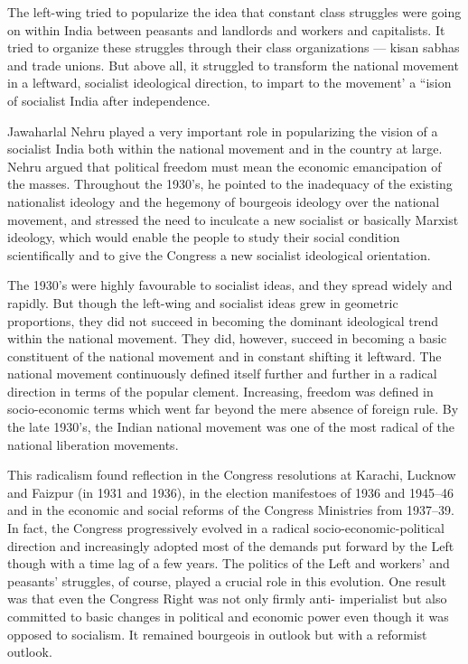 \begin{multicols}{2}
The left-wing tried to popularize the idea that constant class struggles were going on within India between peasants and landlords and workers and capitalists. It tried to organize these struggles through their class organizations --- kisan sabhas and trade unions. But above all, it struggled to transform the national movement in a leftward, socialist ideological direction, to impart to the movement' a ``ision of socialist India after independence.

Jawaharlal Nehru played a very important role in popularizing the vision of a socialist India both within the national movement and in the country at large. Nehru argued that political freedom must mean the economic emancipation of the masses. Throughout the 1930's, he pointed to the inadequacy of the existing nationalist ideology and the hegemony of bourgeois ideology over the national movement, and stressed the need to inculcate a new socialist or basically Marxist ideology, which would enable the people to study their social condition scientifically and to give the Congress a new socialist ideological orientation.

The 1930's were highly favourable to socialist ideas, and they spread widely and rapidly. But though the left-wing and socialist ideas grew in geometric proportions, they did not succeed in becoming the dominant ideological trend within the national movement. They did, however, succeed in becoming a basic constituent of the national movement and in constant shifting it leftward. The national movement continuously defined itself further and further in a radical direction in terms of the popular clement. Increasing, freedom was defined in socio-economic terms which went far beyond the mere absence of foreign rule. By the late 1930's, the Indian national movement was one of the most radical of the national liberation movements.

This radicalism found reflection in the Congress resolutions at Karachi, Lucknow and Faizpur (in 1931 and 1936), in the election manifestoes of 1936 and 1945--46 and in the economic and social reforms of the Congress Ministries from 1937--39. In fact, the Congress progressively evolved in a radical socio-economic-political direction and increasingly adopted most of the demands put forward by the Left though with a time lag of a few years. The politics of the Left and workers' and peasants' struggles, of course, played a crucial role in this evolution. One result was that even the Congress Right was not only firmly anti- imperialist but also committed to basic changes in political and economic power even though it was opposed to socialism. It remained bourgeois in outlook but with a reformist outlook.


\end{multicols}
